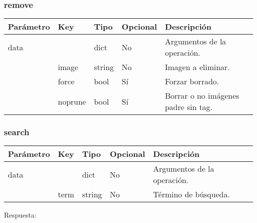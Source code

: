 			\subsubsection{remove}
				\begin{table}[h!]
					\centering
	\begin{adjustbox}{max width=\textwidth}
					\begin{tabular}{|l|l|l|l|l|}
						\hline
						Parámetro & Key & Tipo & Opcional & Descripción \\ \hline
						data &  & dict & No & Argumentos de la operación. \\ \hline
						& image & string & No & Imagen a eliminar. \\ \hline
						& force & bool & Sí & Forzar borrado. \\ \hline
						& noprune & bool & Sí & Borrar o no imágenes padre sin tag. \\ \hline
					\end{tabular}
\end{adjustbox}
				\end{table}
			
			\pagebreak
			\subsubsection{search}
				\begin{table}[h!]
					\centering
	\begin{adjustbox}{max width=\textwidth}
					\begin{tabular}{|l|l|l|l|l|}
						\hline
						Parámetro & Key & Tipo & Opcional & Descripción \\ \hline
						data &  & dict & No & Argumentos de la operación. \\ \hline
						& term & string & No & Término de búsqueda. \\ \hline
					\end{tabular}
\end{adjustbox}
				\end{table}
			
				Respuesta:
				
